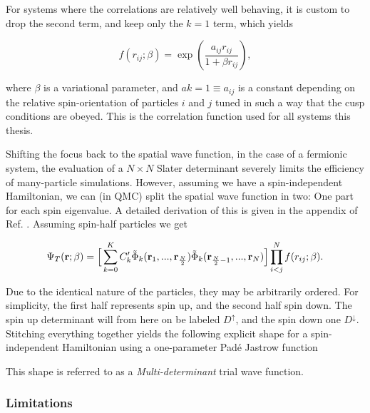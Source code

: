 For systems where the correlations are relatively well behaving, it is custom to drop the second term, and keep only the $k=1$ term, which yields

\begin{equation}
 \label{eq:jastrow}
 f(r_{ij}; \beta) = \exp\left(\frac{a_{ij} r_{ij}}{1 + \beta r_{ij}}\right),
\end{equation}

where $\beta$ is a variational parameter, and $a{k=1} \equiv a_{ij}$ is a constant depending on the relative spin-orientation of particles $i$ and $j$ tuned in such a way that the cusp conditions are obeyed. This is the correlation function used for all systems this thesis.

Shifting the focus back to the spatial wave function, in the case of a fermionic system, the evaluation of a $N\times N$ Slater determinant severely limits the efficiency of many-particle simulations. However, assuming we have a spin-independent Hamiltonian, we can (in QMC) split the spatial wave function in two: One part for each spin eigenvalue. A detailed derivation of this is given in the appendix of Ref. \cite{QMCPHD2008}. Assuming spin-half particles we get

\begin{equation}
 \Psi_T(\mathbf{r}; \beta) = \Big[\sum_{k=0}^K C_k'\tilde\Phi_k(\mathbf{r}_1, ..., \mathbf{r}_{\frac{N}{2}})\tilde\Phi_k(\mathbf{r}_{\frac{N}{2}-1}, ..., \mathbf{r}_{N})\Big]\prod_{i<j}^Nf(r_{ij}; \beta).
\end{equation}

Due to the identical nature of the particles, they may be arbitrarily ordered. For simplicity, the first half represents spin up, and the second half spin down. The spin up determinant will from here on be labeled $D^\uparrow$, and the spin down one $D^\downarrow$. Stitching everything together yields the following explicit shape for a spin-independent Hamiltonian using a one-parameter Padé Jastrow function


This shape is referred to as a \textit{Multi-determinant} trial wave function. 

\subsubsection{Limitations}

